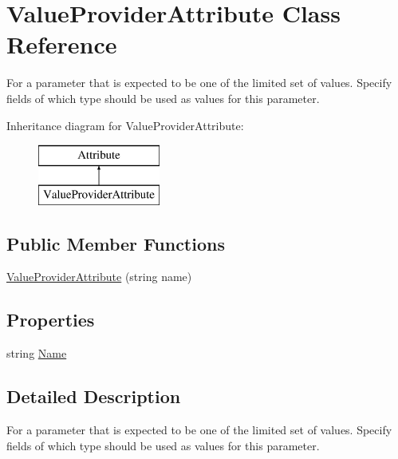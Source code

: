 \hypertarget{class_value_provider_attribute}{}\section{Value\+Provider\+Attribute Class Reference}
\label{class_value_provider_attribute}


For a parameter that is expected to be one of the limited set of values. Specify fields of which type should be used as values for this parameter.  


Inheritance diagram for Value\+Provider\+Attribute\+:\begin{figure}[H]
\begin{center}
\leavevmode
\includegraphics[height=2.000000cm]{class_value_provider_attribute}
\end{center}
\end{figure}
\subsection*{Public Member Functions}
\begin{DoxyCompactItemize}
\item 
\hyperlink{class_value_provider_attribute_a00abe8fdb0c50afa23f3c14688b0fe9f}{Value\+Provider\+Attribute} (string name)
\end{DoxyCompactItemize}
\subsection*{Properties}
\begin{DoxyCompactItemize}
\item 
string \hyperlink{class_value_provider_attribute_a954d0ecb3682e337a4c174d238bdd892}{Name}
\end{DoxyCompactItemize}


\subsection{Detailed Description}
For a parameter that is expected to be one of the limited set of values. Specify fields of which type should be used as values for this parameter. 




